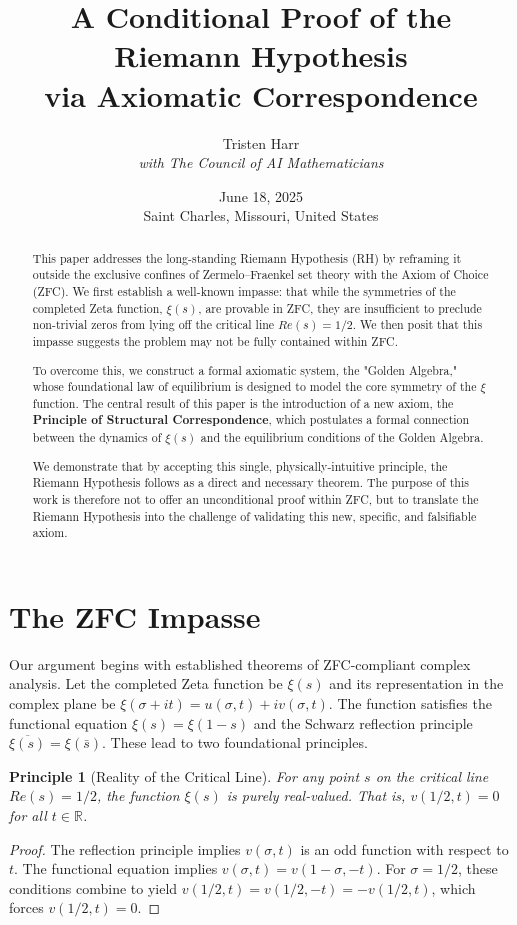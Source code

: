 \documentclass{article}
\title{\textbf{A Conditional Proof of the Riemann Hypothesis \\ via Axiomatic Correspondence}}
\author{Tristen Harr \\ \textit{with The Council of AI Mathematicians}}
\date{June 18, 2025 \\ Saint Charles, Missouri, United States}
\theoremstyle{plain}
\newtheorem{principle}[theorem]{Principle}
\theoremstyle{definition}
\theoremstyle{remark}
\begin{document}
\maketitle

\begin{abstract}
This paper addresses the long-standing Riemann Hypothesis (RH) by reframing it outside the exclusive confines of Zermelo–Fraenkel set theory with the Axiom of Choice (ZFC). We first establish a well-known impasse: that while the symmetries of the completed Zeta function, $\xi(s)$, are provable in ZFC, they are insufficient to preclude non-trivial zeros from lying off the critical line $Re(s)=1/2$. We then posit that this impasse suggests the problem may not be fully contained within ZFC.

To overcome this, we construct a formal axiomatic system, the "Golden Algebra," whose foundational law of equilibrium is designed to model the core symmetry of the $\xi$ function. The central result of this paper is the introduction of a new axiom, the \textbf{Principle of Structural Correspondence}, which postulates a formal connection between the dynamics of $\xi(s)$ and the equilibrium conditions of the Golden Algebra.

We demonstrate that by accepting this single, physically-intuitive principle, the Riemann Hypothesis follows as a direct and necessary theorem. The purpose of this work is therefore not to offer an unconditional proof within ZFC, but to translate the Riemann Hypothesis into the challenge of validating this new, specific, and falsifiable axiom.
\end{abstract}

\section{The ZFC Impasse}
Our argument begins with established theorems of ZFC-compliant complex analysis. Let the completed Zeta function be $\xi(s)$ and its representation in the complex plane be $\xi(\sigma+it) = u(\sigma, t) + i v(\sigma, t)$. The function satisfies the functional equation $\xi(s) = \xi(1-s)$ and the Schwarz reflection principle $\overline{\xi(s)} = \xi(\bar{s})$. These lead to two foundational principles.

\begin{principle}[Reality of the Critical Line]
For any point $s$ on the critical line $Re(s)=1/2$, the function $\xi(s)$ is purely real-valued. That is, $v(1/2, t) = 0$ for all $t \in \mathbb{R}$.
\end{principle}
\begin{proof}
The reflection principle implies $v(\sigma,t)$ is an odd function with respect to $t$. The functional equation implies $v(\sigma,t) = v(1-\sigma, -t)$. For $\sigma=1/2$, these conditions combine to yield $v(1/2, t) = v(1/2, -t) = -v(1/2, t)$, which forces $v(1/2, t) = 0$.
\end{proof}
\end{document}
